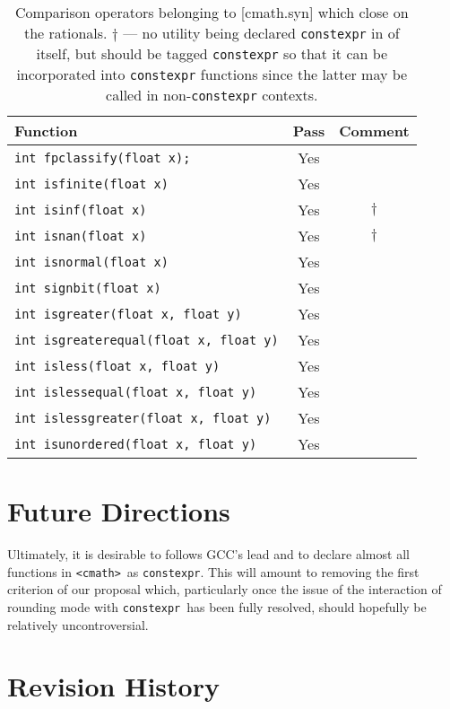 \documentclass[prd,twocolumn,amsmath,amssymb,nofootinbib,eqsecnum]{revtex4-1}
\newcommand{\constexpr}{\code{constexpr}\xspace}
\newcommand{\code}[1]{{\tt #1}}
\newcommand{\header}[1]{{\tt <#1>}}
\newcommand{\cmath}{\header{cmath}}
\begin{document}
\begin{table}[h]
	\begin{tabular}{lcc}
		Function & Pass & Comment
	\\
	\hline \hline
		\code{int fpclassify(float x);} & Yes &
	\\
	\hline
		\code{int isfinite(float x)} & Yes &
	\\
	\hline
		\code{int isinf(float x)} & Yes & $\dagger$
	\\
	\hline
		\code{int isnan(float x)} & Yes & $\dagger$ 
	\\
	\hline
		\code{int isnormal(float x)} & Yes &
	\\
	\hline
		\code{int signbit(float x)} & Yes &
	\\
	\hline
		\code{int isgreater(float x, float y)} & Yes &
	\\
	\hline
		\code{int isgreaterequal(float x, float y)} & Yes &
	\\
	\hline
		\code{int isless(float x, float y)} & Yes &
	\\
	\hline
		\code{int islessequal(float x, float y)} & Yes &
	\\
	\hline
		\code{int islessgreater(float x, float y)} & Yes &
	\\
	\hline
		\code{int isunordered(float x, float y)} & Yes &
	\end{tabular}
\caption{Comparison operators belonging to [cmath.syn] which close on the rationals. $\dagger$ --- no utility being declared \constexpr in of itself, but should be tagged \constexpr so that it can be incorporated into \constexpr functions since the latter may be called in  non-\constexpr contexts.}
\label{tab:26.9.4}
\end{table}

\section{Future Directions}

Ultimately, it is desirable to follows GCC's lead and to declare almost all functions in \cmath\ as \constexpr. This will amount to removing the first criterion of our proposal which, particularly once the issue of the interaction of rounding mode with \constexpr\ has been fully resolved, should hopefully be relatively uncontroversial.

\section{Revision History}
\end{document}
